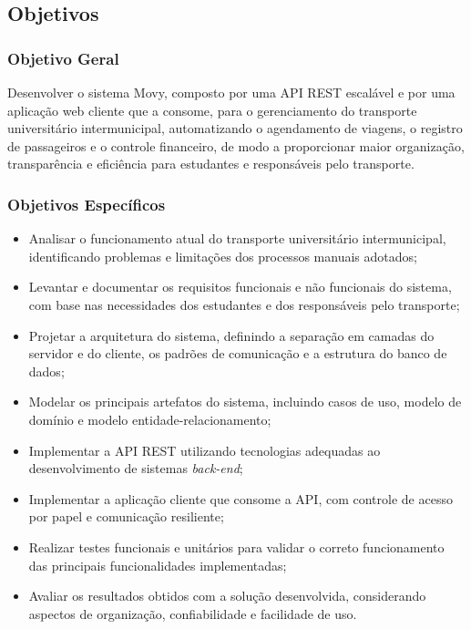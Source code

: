\documentclass[12pt,openright,oneside,a4paper]{article}
\begin{document}
\subsection{Objetivos}

\subsubsection{Objetivo Geral}
Desenvolver o sistema Movy, composto por uma API REST escalável e por uma aplicação web cliente que a consome, para o gerenciamento do transporte universitário intermunicipal, automatizando o agendamento de viagens, o registro de passageiros e o controle financeiro, de modo a proporcionar maior organização, transparência e eficiência para estudantes e responsáveis pelo transporte.

\subsubsection{Objetivos Específicos}
\begin{itemize}
\item Analisar o funcionamento atual do transporte universitário intermunicipal, identificando problemas e limitações dos processos manuais adotados;
\item Levantar e documentar os requisitos funcionais e não funcionais do sistema, com base nas necessidades dos estudantes e dos responsáveis pelo transporte;
\item Projetar a arquitetura do sistema, definindo a separação em camadas do servidor e do cliente, os padrões de comunicação e a estrutura do banco de dados;
\item Modelar os principais artefatos do sistema, incluindo casos de uso, modelo de domínio e modelo entidade-relacionamento;
\item Implementar a API REST utilizando tecnologias adequadas ao desenvolvimento de sistemas \textit{back-end};
\item Implementar a aplicação cliente que consome a API, com controle de acesso por papel e comunicação resiliente;
\item Realizar testes funcionais e unitários para validar o correto funcionamento das principais funcionalidades implementadas;
\item Avaliar os resultados obtidos com a solução desenvolvida, considerando aspectos de organização, confiabilidade e facilidade de uso.
\end{itemize}


\end{document}
